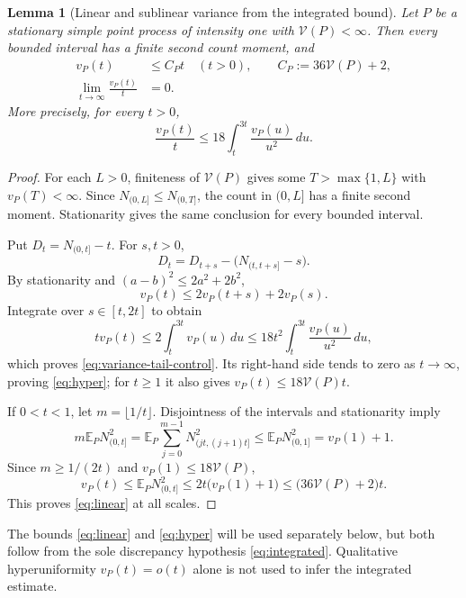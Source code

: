 \documentclass[11pt,reqno]{amsart}
\numberwithin{equation}{section}
\newtheorem{lemma}[theorem]{Lemma}
\theoremstyle{definition}
\theoremstyle{remark}
\newcommand{\E}{\mathbb E}
\newcommand{\1}{\mathbf 1}
\newcommand{\dd}{\,d}
\begin{document}
\begin{samepage}
\begin{lemma}[Linear and sublinear variance from the integrated bound]
\label{lem:integrated-consequences}
Let $P$ be a stationary simple point process of intensity one with
$\mathcal V(P)<\infty$. Then every bounded interval has a finite second
count moment, and
\begin{align}
v_P(t)&\le C_Pt\quad(t>0),\qquad
 C_P:=36\mathcal V(P)+2,\label{eq:linear}\\
\lim_{t\to\infty}\frac{v_P(t)}t&=0.\label{eq:hyper}
\end{align}
More precisely, for every $t>0$,
\begin{equation}\label{eq:variance-tail-control}
\frac{v_P(t)}t
\le18\int_t^{3t}\frac{v_P(u)}{u^2}\dd u.
\end{equation}
\end{lemma}
\end{samepage}

\begin{proof}
For each $L>0$, finiteness of $\mathcal V(P)$ gives some
$T>\max\{1,L\}$ with $v_P(T)<\infty$. Since
$N_{(0,L]}\le N_{(0,T]}$, the count in $(0,L]$ has a finite second
moment. Stationarity gives the same conclusion for every bounded
interval.

Put $D_t=N_{(0,t]}-t$. For $s,t>0$,
\[
D_t=D_{t+s}-\bigl(N_{(t,t+s]}-s\bigr).
\]
By stationarity and $(a-b)^2\le2a^2+2b^2$,
\[
v_P(t)\le2v_P(t+s)+2v_P(s).
\]
Integrate over $s\in[t,2t]$ to obtain
\[
tv_P(t)\le2\int_t^{3t}v_P(u)\dd u
\le18t^2\int_t^{3t}\frac{v_P(u)}{u^2}\dd u,
\]
which proves \eqref{eq:variance-tail-control}. Its right-hand side
tends to zero as $t\to\infty$, proving \eqref{eq:hyper}; for $t\ge1$
it also gives $v_P(t)\le18\mathcal V(P)t$.

If $0<t<1$, let $m=\lfloor1/t\rfloor$. Disjointness of the intervals
and stationarity imply
\[
m\E_PN_{(0,t]}^2
 =\E_P\sum_{j=0}^{m-1}N_{(jt,(j+1)t]}^2
 \le\E_PN_{(0,1]}^2=v_P(1)+1.
\]
Since $m\ge1/(2t)$ and $v_P(1)\le18\mathcal V(P)$,
\[
v_P(t)\le\E_PN_{(0,t]}^2
\le2t\bigl(v_P(1)+1\bigr)
\le\bigl(36\mathcal V(P)+2\bigr)t.
\]
This proves \eqref{eq:linear} at all scales.
\end{proof}

The bounds \eqref{eq:linear} and \eqref{eq:hyper} will be used
separately below, but both follow from the sole discrepancy hypothesis
\eqref{eq:integrated}. Qualitative hyperuniformity
$v_P(t)=o(t)$ alone is not used to infer the integrated estimate.
\end{document}
